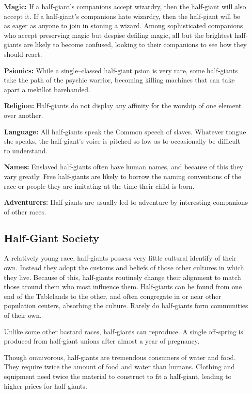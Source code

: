 \documentclass[10pt,a4paper,twocolumn]{d20}
\begin{document}
\textbf{Magic:} If a half‐giant’s companions accept wizardry, then the half‐giant will also accept it. If a half‐giant’s companions hate wizardry, then the half‐giant will be as eager as anyone to join in stoning a wizard. Among sophisticated companions who accept preserving magic but despise defiling magic, all but the brightest half‐giants are likely to become confused, looking to their companions to see how they should react.

\textbf{Psionics:} While a single–classed half‐giant psion is very rare, some half‐giants take the path of the psychic warrior, becoming killing machines that can take apart a mekillot barehanded.

\textbf{Religion:} Half‐giants do not display any affinity for the worship of one element over another.

\textbf{Language:} All half‐giants speak the Common speech of slaves. Whatever tongue she speaks, the half‐giant’s voice is pitched so low as to occasionally be difficult to understand.

\textbf{Names:} Enslaved half‐giants often have human names, and because of this they vary greatly. Free half‐giants are likely to borrow the naming conventions of the race or people they are imitating at the time their child is born.

\textbf{Adventurers:} Half‐giants are usually led to adventure by interesting companions of other races.

\subsection{Half-Giant Society}
A relatively young race, half‐giants possess very little cultural identify of their own. Instead they adopt the customs and beliefs of those other cultures in which they live. Because of this, half‐giants routinely change their alignment to match those around them who most influence them.
Half‐giants can be found from one end of the Tablelands to the other, and often congregate in or near other population centers, absorbing the culture. Rarely do half‐giants form communities of their own.

Unlike some other bastard races, half‐giants can reproduce. A single off‐spring is produced from half‐giant unions after almost a year of pregnancy.

Though omnivorous, half‐giants are tremendous consumers of water and food. They require twice the amount of food and water than humans. Clothing and equipment need twice the material to construct to fit a half‐giant, leading to higher prices for half‐giants.
\end{document}
